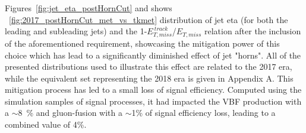\hspace{10pt} Figures~\ref{fig:jet_eta_postHornCut} and shows ~\ref{fig:2017_postHornCut_met_vs_tkmet} distribution of jet eta (for both the leading and subleading jets) and the 1-$E_{T,miss}^{~track}$/$E_{T, miss}$ relation after the inclusion of the aforementioned requirement, showcasing the mitigation power of this choice which has lead to a significantly diminished effect of jet "horns". All of the presented distributions used to illustrate this effect are related to the 2017 era, while the equivalent set representing the 2018 era is given in Appendix A. This mitigation process has led to a small loss of signal efficiency. Computed using the simulation samples of signal processes, it had impacted the VBF production with a $\sim$8~\% and gluon-fusion with a $\sim$1\% of signal efficiency loss, leading to a combined value of 4\%.


